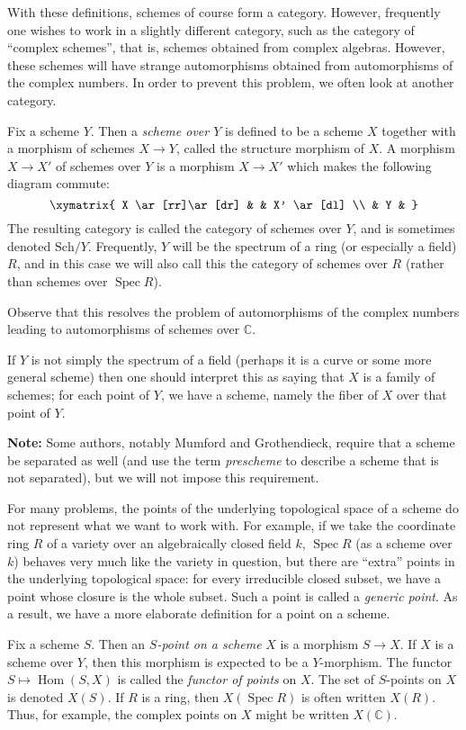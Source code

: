 \documentclass[12pt]{article}
\newcommand{\lra}{\longrightarrow}
\newcommand{\Hom}{\operatorname{Hom}}
\newcommand{\Spec}{\operatorname{Spec}}
\begin{document}
With these definitions, schemes of course form a category.  However, frequently one wishes to work in a slightly different category, such as the category of ``complex schemes'', that is, schemes obtained from complex algebras.  However, these schemes will have strange automorphisms obtained from automorphisms of the complex numbers.  In order to prevent this problem, we often look at another category.

Fix a scheme $Y$.  Then a \emph{scheme over $Y$} is defined to be a scheme $X$ together with a morphism of schemes $X \lra Y$, called the structure morphism of $X$.  A morphism $X\to X'$ of schemes over $Y$ is a morphism $X\to X'$ which makes the following diagram commute:
\[
\xymatrix{
X \ar[rr]\ar[dr] & & X' \ar[dl] \\
& Y &
}
\]
The resulting category is called the category of schemes over $Y$, and is sometimes denoted $\text{Sch}/Y$.  Frequently, $Y$ will be the spectrum of a ring (or especially a field) $R$, and in this case we will also call this the category of schemes over $R$ (rather than schemes over $\Spec R$).

Observe that this resolves the problem of automorphisms of the complex numbers leading to automorphisms of schemes over $\mathbb{C}$. 

If $Y$ is not simply the spectrum of a field (perhaps it is a curve or some more general scheme) then one should interpret this as saying that $X$ is a family of schemes; for each point of $Y$, we have a scheme, namely the fiber of $X$ over that point of $Y$. 

\textbf{Note:} Some authors, notably Mumford and Grothendieck, require that a scheme be separated as well (and use the term \emph{prescheme} to describe a scheme that is not separated), but we will not impose this requirement.

For many problems, the points of the underlying topological space of a scheme do not represent what we want to work with.  For example, if we take the coordinate ring $R$ of a variety over an algebraically closed field $k$, $\Spec R$ (as a scheme over $k$) behaves very much like the variety in question, but there are ``extra'' points in the underlying topological space: for every irreducible closed subset, we have a point whose closure is the whole subset.  Such a point is called a \emph{generic point}.  As a result, we have a more elaborate definition for a point on a scheme.

\clearpage
Fix a scheme $S$.  Then an \emph{$S$-point on a scheme} $X$ is a morphism $S\to X$.  If $X$ is a scheme over $Y$, then this morphism is expected to be a $Y$-morphism.  The functor $S\mapsto \Hom(S,X)$ is called the \emph{functor of points} on $X$.  The set of $S$-points on $X$ is denoted $X(S)$.  If $R$ is a ring, then $X(\Spec R)$ is often written $X(R)$.  Thus, for example, the complex points on $X$ might be written $X(\mathbb{C})$. 
\end{document}
